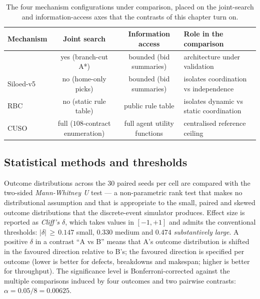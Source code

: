 \begin{table}[ht]
\centering
\caption{The four mechanism configurations under comparison, placed
on the joint-search and information-access axes that the contrasts of
this chapter turn on.}
\label{tab:val-mechanisms}
\small
\begin{tabularx}{\textwidth}{@{}l c c X@{}}
\toprule
\textbf{Mechanism} & \textbf{Joint search} & \textbf{Information access} & \textbf{Role in the comparison} \\
\midrule
\NEXUS{}    & yes (branch-cut A*) & bounded (bid summaries)
            & architecture under validation \\
\addlinespace
Siloed-v5   & no (home-only picks) & bounded (bid summaries)
            & isolates coordination vs independence \\
\addlinespace
RBC         & no (static rule table) & public rule table
            & isolates dynamic vs static coordination \\
\addlinespace
CUSO        & full ($108$-contract enumeration) & full agent utility functions
            & centralised reference ceiling \\
\bottomrule
\end{tabularx}
\end{table}

\subsection{Statistical methods and thresholds}
\label{subsec:val-stats}

Outcome distributions across the $30$ paired seeds per cell are
compared with the two-sided \emph{Mann-Whitney U} test --- a
non-parametric rank test that makes no distributional assumption and
that is appropriate to the small, paired and skewed outcome
distributions that the discrete-event simulator produces. Effect size
is reported as \emph{Cliff's $\delta$}, which takes values in
$[-1, +1]$ and admits the conventional thresholds: $|\delta|\,\ge\,0.147$
small, $0.330$ medium and $0.474$ \emph{substantively large}. A positive
$\delta$ in a contrast ``A vs B'' means that A's outcome distribution
is shifted in the favoured direction relative to B's; the favoured
direction is specified per outcome (lower is better for defects,
breakdowns and makespan; higher is better for throughput). The
significance level is Bonferroni-corrected against the multiple
comparisons induced by four outcomes and two pairwise contrasts:
$\alpha = 0.05/8 = 0.00625$.

